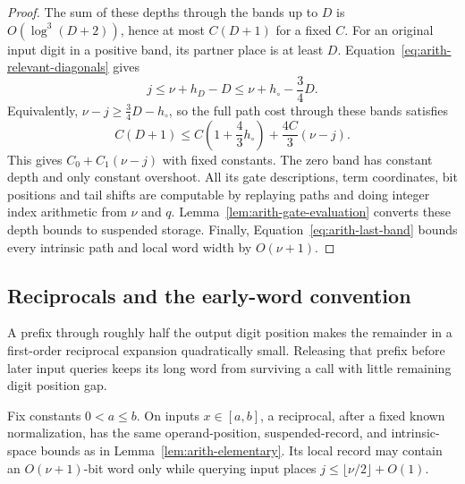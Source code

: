 \begin{proof}
The sum of these depths through the bands up to $D$ is
$O(\log^3(D+2))$, hence at most $C(D+1)$ for a fixed $C$.
For an original input digit in a positive band, its partner place
is at least $D$.  Equation~\eqref{eq:arith-relevant-diagonals} gives
\begin{equation}
 j\leq \nu+h_D-D
       \leq \nu+h_\circ-\frac34D.
 \label{eq:arith-multiplication-latency}
\end{equation}
Equivalently, $\nu-j\geq\tfrac34D-h_\circ$, so the full path cost
through these bands satisfies
\[
 C(D+1)\leq C\left(1+\frac43h_\circ\right)
                   +\frac{4C}{3}(\nu-j).
\]
This gives $C_0+C_1(\nu-j)$ with fixed constants.  The zero band
has constant depth and only constant overshoot.  All its gate
descriptions, term coordinates, bit positions and tail shifts are
computable by replaying paths and doing integer index arithmetic
from $\nu$ and $q$.  Lemma~\ref{lem:arith-gate-evaluation} converts these
depth bounds to suspended storage.  Finally,
Equation~\eqref{eq:arith-last-band} bounds every intrinsic path
and local word width by $O(\nu+1)$.
\end{proof}

\subsection{Reciprocals and the early-word convention}

A prefix through roughly half the output digit position makes the remainder
in a first-order reciprocal expansion quadratically small. Releasing
that prefix before later input queries keeps its long word from
surviving a call with little remaining digit position gap.

\begin{lemma}
\label{lem:arith-reciprocal}
Fix constants $0<a\leq b$.  On inputs $x\in[a,b]$, a reciprocal,
after a fixed known normalization, has the same operand-position,
suspended-record, and intrinsic-space bounds as in
Lemma~\ref{lem:arith-elementary}.  Its local record may contain an
$O(\nu+1)$-bit word only while querying input places
$j\leq\lfloor \nu/2\rfloor+O(1)$.
\end{lemma}

